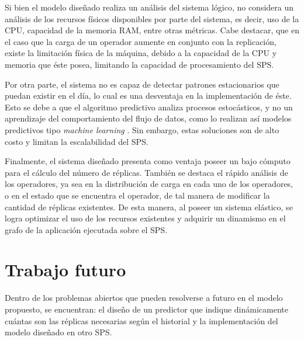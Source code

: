 Si bien el modelo diseñado realiza un análisis del sistema lógico, no considera un análisis de los recursos físicos disponibles por parte del sistema, es decir, uso de la CPU, capacidad de la memoria RAM, entre otras métricas. Cabe destacar, que en el caso que la carga de un operador aumente en conjunto con la replicación, existe la limitación física de la máquina, debido a la capacidad de la CPU y memoria que éste posea, limitando la capacidad de procesamiento del SPS.

Por otra parte, el sistema no es capaz de detectar patrones estacionarios que puedan existir en el día, lo cual es una desventaja en la implementación de éste. Esto se debe a que el algoritmo predictivo analiza procesos estocásticos, y no un aprendizaje del comportamiento del flujo de datos, como lo realizan así modelos predictivos tipo \textit{machine learning} \citep{bookMohri2012}. Sin embargo, estas soluciones son de alto costo y limitan la escalabilidad del SPS.

Finalmente, el sistema diseñado presenta como ventaja poseer un bajo cómputo para el cálculo del número de réplicas. También se destaca el rápido análisis de los operadores, ya sea en la distribución de carga en cada uno de los operadores, o en el estado que se encuentra el operador, de tal manera de modificar la cantidad de réplicas existentes. De esta manera, al poseer un sistema elástico, se logra optimizar el uso de los recursos existentes y adquirir un dinamismo en el grafo de la aplicación ejecutada sobre el SPS.

\section{Trabajo futuro}

Dentro de los problemas abiertos que pueden resolverse a futuro en el modelo propuesto, se encuentran: el diseño de un predictor que indique dinámicamente cuántas son las réplicas necesarias según el historial y la implementación del modelo diseñado en otro SPS.



